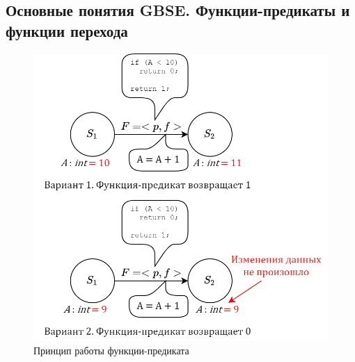 \subsection{Основные понятия GBSE. Функции-предикаты и функции перехода}
\begin{frame}
	\begin{figure}
		\begin{minipage}{0.49\textwidth}
			\centering
			\includegraphics[height=0.5\textheight]{images/illustration.predicate.png}
			\caption{Принцип работы функции-предиката}
		\end{minipage}\hfill\begin{minipage}{0.49\textwidth}
			\centering

\end{minipage}
\end{figure}
\end{frame}
